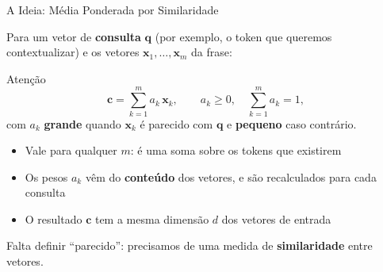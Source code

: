 \documentclass[aspectratio=169,xcolor=dvipsnames]{beamer}
\begin{document}
\begin{frame}{A Ideia: Média Ponderada por Similaridade}

Para um vetor de \textbf{consulta} $\mathbf{q}$ (por exemplo, o token que queremos contextualizar) e os vetores $\mathbf{x}_1, \dots, \mathbf{x}_m$ da frase:

\vspace{4pt}

\begin{exampleblock}{Atenção}
\[
\mathbf{c} = \sum_{k=1}^{m} a_k \, \mathbf{x}_k, \qquad a_k \geq 0, \quad \sum_{k=1}^{m} a_k = 1,
\]
com $a_k$ \textbf{grande} quando $\mathbf{x}_k$ é parecido com $\mathbf{q}$ e \textbf{pequeno} caso contrário.
\end{exampleblock}

\vspace{6pt}

\begin{itemize}
    \item Vale para qualquer $m$: é uma soma sobre os tokens que existirem
    \item Os pesos $a_k$ vêm do \textbf{conteúdo} dos vetores, e são recalculados para cada consulta
    \item O resultado $\mathbf{c}$ tem a mesma dimensão $d$ dos vetores de entrada
\end{itemize}

\vspace{6pt}

\centering
Falta definir ``parecido'': precisamos de uma medida de \textbf{similaridade} entre vetores.

\end{frame}

\end{document}
